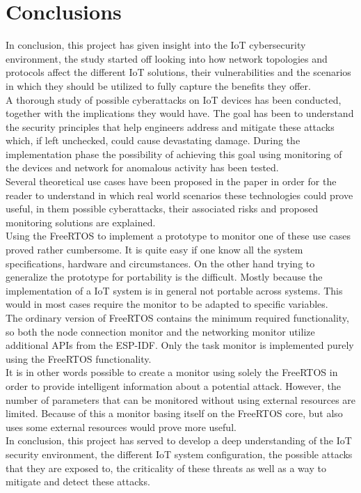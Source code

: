 \chapter{Conclusions}

In conclusion, this project has given insight into the IoT cybersecurity environment, the study started off looking into how network topologies and protocols affect the different IoT solutions, their vulnerabilities and the scenarios in which they should be utilized to fully capture the benefits they offer.\\

A thorough study of possible cyberattacks on IoT devices has been conducted, together with the implications they would have. The goal has been to understand the security principles that help engineers address and mitigate these attacks which, if left unchecked, could cause devastating damage. During the implementation phase the possibility of achieving this goal using monitoring of the devices and network for anomalous activity has been tested.\\

Several theoretical use cases have been proposed in the paper in order for the reader to understand in which real world scenarios these technologies could prove useful, in them possible cyberattacks, their associated risks and proposed monitoring solutions are explained.\\

Using the FreeRTOS to implement a prototype to monitor one of these use cases proved rather cumbersome. It is quite easy if one know all the system specifications, hardware and circumstances. On the other hand trying to generalize the prototype for portability is the difficult. Mostly because the implementation of a IoT system is in general not portable across systems. This would in most cases require the monitor to be adapted to specific variables. \\

The ordinary version of FreeRTOS contains the minimum required functionality, so both the node connection monitor and the networking monitor utilize additional APIs from the ESP-IDF. Only the task monitor is implemented purely using the FreeRTOS functionality. \\

It is in other words possible to create a monitor using solely the FreeRTOS in order to provide intelligent information about a potential attack. However, the number of parameters that can be monitored without using external resources are limited. Because of this a monitor basing itself on the FreeRTOS core, but also uses some external resources would prove more useful. \\

In conclusion, this project has served to develop a deep understanding of the IoT security environment, the different IoT system configuration, the possible attacks that they are exposed to, the criticality of these threats as well as a way to mitigate and detect these attacks.